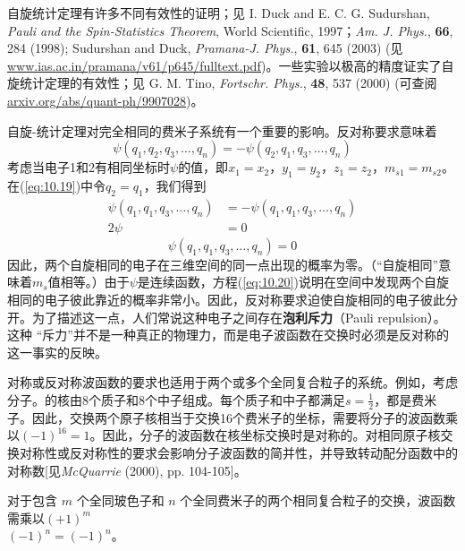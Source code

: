     自旋统计定理有许多不同有效性的证明；见 I. Duck and E. C. G. Sudurshan, \textit{Pauli and the Spin-Statistics Theorem}, World Scientific, 1997；\textit{Am. J. Phys.}, \textbf{66}, 284 (1998); Sudurshan and Duck, \textit{Pramana-J. Phys.}, \textbf{61}, 645 (2003) (见 \url{www.ias.ac.in/pramana/v61/p645/fulltext.pdf})。一些实验以极高的精度证实了自旋统计定理的有效性；见 G. M. Tino, \textit{Fortschr. Phys.}, \textbf{48}, 537 (2000) (可查阅 \url{arxiv.org/abs/quant-ph/9907028})。

    自旋-统计定理对完全相同的费米子系统有一个重要的影响。反对称要求意味着
    \begin{equation}
        \psi\left(q_1, q_2, q_3, \ldots, q_n\right) = -\psi\left(q_2, q_1, q_3, \ldots, q_n\right)
        \label{eq:10.19}
    \end{equation}
    考虑当电子1和2有相同坐标时$\psi$的值，即$x_1 = x_2$，$y_1 = y_2$，$z_1 = z_2$，$m_{s1} = m_{s2}$。在(\ref{eq:10.19})中令$q_2 = q_1$，我们得到
    \begin{equation*}
        \begin{aligned}
            \psi\left(q_1, q_1, q_3, \ldots, q_n\right) &= -\psi\left(q_1, q_1, q_3, \ldots, q_n\right) \\
            2\psi &= 0
        \end{aligned}
    \end{equation*}
    \begin{equation}
        \psi\left(q_1, q_1, q_3, \ldots, q_n\right) = 0
        \label{eq:10.20}
    \end{equation}
    因此，两个自旋相同的电子在三维空间的同一点出现的概率为零。（“自旋相同”意味着$m_s$值相等。）由于$\psi$是连续函数，方程(\ref{eq:10.20})说明在空间中发现两个自旋相同的电子彼此靠近的概率非常小。因此，反对称要求迫使自旋相同的电子彼此分开。为了描述这一点，人们常说这种电子之间存在\textbf{泡利斥力}（Pauli repulsion）。这种 “斥力”并不是一种真正的物理力，而是电子波函数在交换时必须是反对称的这一事实的反映。

    对称或反对称波函数的要求也适用于两个或多个全同复合粒子的系统。例如，考虑分子。的核由8个质子和8个中子组成。每个质子和中子都满足$s = \frac{1}{2}$，都是费米子。因此，交换两个原子核相当于交换16个费米子的坐标，需要将分子的波函数乘以$\left(-1\right)^{16} = 1$。因此，分子的波函数在核坐标交换时是对称的。对相同原子核交换对称性或反对称性的要求会影响分子波函数的简并性，并导致转动配分函数中的对称数[见\textit{McQuarrie} (2000), pp. 104-105]。

    对于包含 $m$ 个全同玻色子和 $n$ 个全同费米子的两个相同复合粒子的交换，波函数需乘以$\left(+1\right)^m$\\$\left(-1\right)^n = \left(-1\right)^n$。

